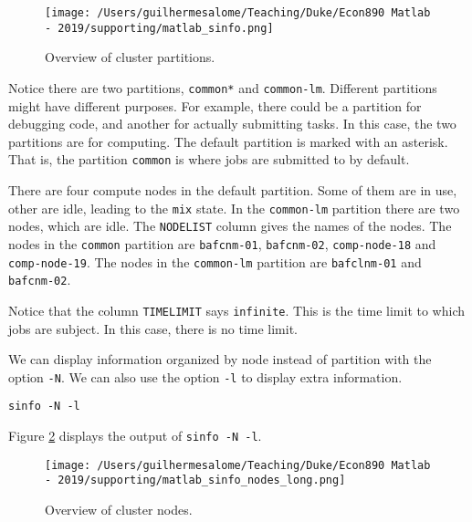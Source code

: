 \documentclass[12pt, a4paper]{article}
\begin{document}
\begin{figure}[H]
\centering
\texttt{[image: /Users/guilhermesalome/Teaching/Duke/Econ890 Matlab - 2019/supporting/matlab\_sinfo.png]}
\caption{\label{fig:org962275b}
Overview of cluster partitions.}
\end{figure}

Notice there are two partitions, \texttt{common*} and \texttt{common-lm}.
Different partitions might have different purposes.
For example, there could be a partition for debugging code, and another for actually submitting tasks.
In this case, the two partitions are for computing.
The default partition is marked with an asterisk.
That is, the partition \texttt{common} is where jobs are submitted to by default.

There are four compute nodes in the default partition. Some of them are in use, other are idle, leading to the \texttt{mix} state.
In the \texttt{common-lm} partition there are two nodes, which are idle.
The \texttt{NODELIST} column gives the names of the nodes.
The nodes in the \texttt{common} partition are \texttt{bafcnm-01}, \texttt{bafcnm-02}, \texttt{comp-node-18} and \texttt{comp-node-19}.
The nodes in the \texttt{common-lm} partition are \texttt{bafclnm-01} and \texttt{bafcnm-02}.

Notice that the column \texttt{TIMELIMIT} says \texttt{infinite}.
This is the time limit to which jobs are subject.
In this case, there is no time limit.

We can display information organized by node instead of partition with the option \texttt{-N}. We can also use the option \texttt{-l} to display extra information.
\lstset{language=bash,label= ,caption= ,captionpos=b,firstnumber=1,numbers=left,style=bash}
\begin{lstlisting}
sinfo -N -l
\end{lstlisting}

Figure \ref{fig:org9834cf6} displays the output of \texttt{sinfo -N -l}.
\begin{figure}[H]
\centering
\texttt{[image: /Users/guilhermesalome/Teaching/Duke/Econ890 Matlab - 2019/supporting/matlab\_sinfo\_nodes\_long.png]}
\caption{\label{fig:org9834cf6}
Overview of cluster nodes.}
\end{figure}
\end{document}
